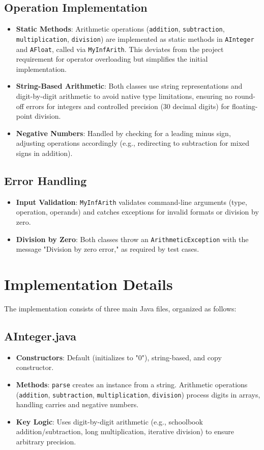 \documentclass[12pt]{article}
\begin{document}
\subsection{Operation Implementation}
\begin{itemize}
    \item \textbf{Static Methods}: Arithmetic operations (\texttt{addition}, \texttt{subtraction}, \texttt{multiplication}, \texttt{division}) are implemented as static methods in \texttt{AInteger} and \texttt{AFloat}, called via \texttt{MyInfArith}. This deviates from the project requirement for operator overloading but simplifies the initial implementation.
    \item \textbf{String-Based Arithmetic}: Both classes use string representations and digit-by-digit arithmetic to avoid native type limitations, ensuring no round-off errors for integers and controlled precision (30 decimal digits) for floating-point division.
    \item \textbf{Negative Numbers}: Handled by checking for a leading minus sign, adjusting operations accordingly (e.g., redirecting to subtraction for mixed signs in addition).
\end{itemize}

\subsection{Error Handling}
\begin{itemize}
    \item \textbf{Input Validation}: \texttt{MyInfArith} validates command-line arguments (type, operation, operands) and catches exceptions for invalid formats or division by zero.
    \item \textbf{Division by Zero}: Both classes throw an \texttt{ArithmeticException} with the message "Division by zero error," as required by test cases.
\end{itemize}

\section{Implementation Details}
The implementation consists of three main Java files, organized as follows:

\subsection{AInteger.java}
\begin{itemize}
    \item \textbf{Constructors}: Default (initializes to "0"), string-based, and copy constructor.
    \item \textbf{Methods}: \texttt{parse} creates an instance from a string. Arithmetic operations (\texttt{addition}, \texttt{subtraction}, \texttt{multiplication}, \texttt{division}) process digits in arrays, handling carries and negative numbers.
    \item \textbf{Key Logic}: Uses digit-by-digit arithmetic (e.g., schoolbook addition/subtraction, long multiplication, iterative division) to ensure arbitrary precision.
\end{itemize}
\end{document}
